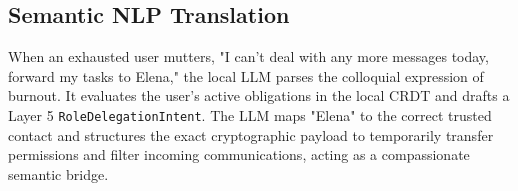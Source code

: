 \subsection{Semantic NLP Translation}
When an exhausted user mutters, "I can't deal with any more messages today, forward my tasks to Elena," the local LLM parses the colloquial expression of burnout. It evaluates the user's active obligations in the local CRDT and drafts a Layer 5 \texttt{RoleDelegationIntent}. The LLM maps "Elena" to the correct trusted contact and structures the exact cryptographic payload to temporarily transfer permissions and filter incoming communications, acting as a compassionate semantic bridge.
